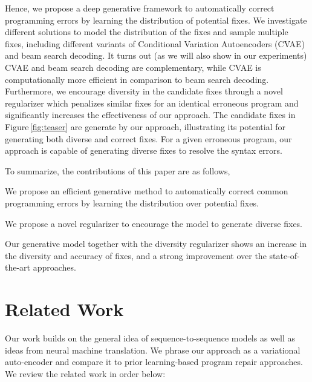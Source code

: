\documentclass[runningheads]{llncs}
\newcommand{\figref}{Figure}
\begin{document}
Hence, we propose a deep generative framework to automatically correct programming errors by learning the distribution of potential fixes. We investigate different solutions to model the distribution of the fixes and sample multiple fixes, including different variants of Conditional Variation Autoencoders (CVAE) and beam search decoding. It turns out (as we will also show in our experiments) CVAE and beam search decoding are complementary, while CVAE is computationally more efficient in comparison to beam search decoding.
Furthermore, we encourage diversity in the candidate fixes through a novel regularizer which penalizes similar fixes for an identical erroneous program and significantly increases the effectiveness of our approach.  The candidate fixes in \figref \,\ref{fig:teaser} are generate by our approach, illustrating its potential for generating both diverse and correct fixes. For a given erroneous program, our approach is capable of generating diverse fixes to resolve the syntax errors.

To summarize, the contributions of this paper are as follows,
\begin{enumerate*}
    \item We propose an efficient generative method to automatically correct common programming errors by learning the distribution over potential fixes.
    \item We propose a novel regularizer to encourage the model to generate diverse fixes.
    \item Our generative model together with the diversity regularizer shows an increase in the diversity and accuracy of fixes, and a strong improvement over the state-of-the-art approaches.
\end{enumerate*}

\section{Related Work}
\label{related_Work}

Our work builds on the general idea of sequence-to-sequence models as well as ideas from neural machine translation. We phrase our approach as a variational auto-encoder and compare it to prior learning-based program repair approaches. We review the related work in order below:
\end{document}
